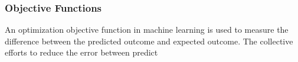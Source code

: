 \subsubsection{Objective Functions}
An optimization objective function in machine learning is used to measure the difference between the predicted outcome and expected outcome. The collective efforts to reduce the error between predict